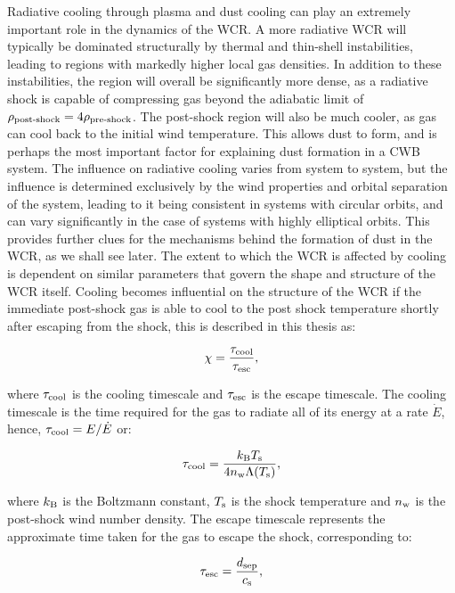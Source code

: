 Radiative cooling through plasma and dust cooling can play an extremely important role in the dynamics of the WCR.
A more radiative WCR will typically be dominated structurally by thermal and thin-shell instabilities, leading to regions with markedly higher local gas densities.
In addition to these instabilities, the region will overall be significantly more dense, as a radiative shock is capable of compressing gas beyond the adiabatic limit of $\rho_\text{post-shock} = 4 \rho_\text{pre-shock}$. 
The post-shock region will also be much cooler, as gas can cool back to the initial wind temperature.
This allows dust to form, and is perhaps the most important factor for explaining dust formation in a CWB system.
The influence on radiative cooling varies from system to system, but the influence is determined exclusively by the wind properties and orbital separation of the system, leading to it being consistent in systems with circular orbits, and can vary significantly in the case of systems with highly elliptical orbits.
This provides further clues for the mechanisms behind the formation of dust in the WCR, as we shall see later.
The extent to which the WCR is affected by cooling is dependent on similar parameters that govern the shape and structure of the WCR itself.
Cooling becomes influential on the structure of the WCR if the immediate post-shock gas is able to cool to the post shock temperature shortly after escaping from the shock, this is described in this thesis as:

\begin{equation}
  \chi = \frac{\tau_\text{cool}}{\tau_\text{esc}} ,
\end{equation}

\noindent
where $\tau_\text{cool}$ is the cooling timescale and $\tau_\text{esc}$ is the escape timescale.
The cooling timescale is the time required for the gas to radiate all of its energy at a rate $\dot{E}$, hence, $\tau_\text{cool} = E/\dot{E}$ or:

\begin{equation}
  \label{eq:taucool}
  \tau_\text{cool} = \frac{k_\text{B}T_\text{s}}{4n_\text{w}\Lambda(T_\text{s})},
\end{equation}

\noindent
where $k_\text{B}$ is the Boltzmann constant, $T_\text{s}$ is the shock temperature and $n_\text{w}$ is the post-shock wind number density.
The escape timescale represents the approximate time taken for the gas to escape the shock, corresponding to:

\begin{equation}
  \label{eq:tauesc}
  \tau_\text{esc} = \frac{d_\text{sep}}{c_\text{s}} , 
\end{equation}

